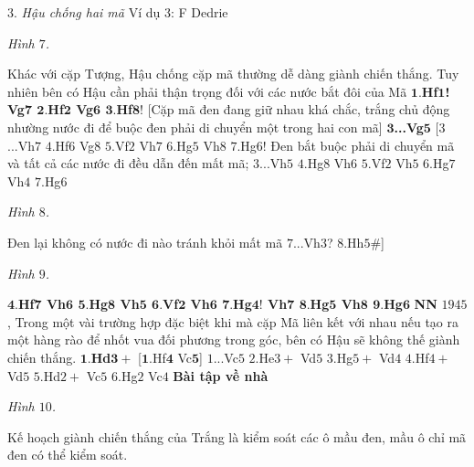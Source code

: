 \begin{multicols}{2}
	$3.$ \textit{Hậu chống hai mã}
	\vskip 0.1cm
	Ví dụ $3$: F Dedrie
	\begin{center}
		\newgame
		\showboard
		\vskip 0.1cm
		\textit{\small\color{gocco}Hình $7$.}
	\end{center}
	Khác với cặp Tượng, Hậu chống cặp mã thường dễ dàng  giành chiến thắng. Tuy nhiên bên có Hậu cần phải thận trọng đối với các nước bắt đôi của Mã
	$\pmb{1.}$\textbf{\color{gocco}Hf$\pmb{1}$! Vg$\pmb{7}$ $\pmb{2.}$Hf$\pmb{2}$ Vg$\pmb{6}$ $\pmb{3.}$Hf$\pmb{8!}$} [Cặp mã đen đang giữ nhau khá chắc, trắng chủ động nhường nước đi để buộc đen phải di chuyển một trong hai con mã]
	\vskip 0.1cm
	$\pmb{3}$\textbf{\color{gocco}...Vg}$\pmb{5}$ [$3$...Vh$7$ $4.$Hf$6$ Vg$8$ $5.$Vf$2$ Vh$7$ $6.$Hg$5$ Vh$8$ $7.$Hg$6!$ 
	\vskip 0.1cm
	Đen bắt buộc phải di chuyển mã và tất cả các nước đi đều dẫn đến mất mã; $3$...Vh$5$ $4.$Hg$8$ Vh$6$ $5.$Vf$2$ Vh$5$ $6.$Hg$7$ Vh$4$ $7.$Hg$6$
		\begin{center}
		\newgame
		\showboard
		\vskip 0.1cm
		\textit{\small\color{gocco}Hình $8$.}
	\end{center}
	Đen lại không có nước đi nào tránh khỏi mất mã $7$...Vh$3$? $8.$Hh$5\#$]
	\begin{center}
		\newgame
		\showboard
		\vskip 0.1cm
		\textit{\small\color{gocco}Hình $9$.}
	\end{center}
	$\pmb{4.}$\textbf{\color{gocco}Hf$\pmb{7}$ Vh$\pmb{6}$ $\pmb{5.}$Hg$\pmb{8}$ Vh$\pmb{5}$ $\pmb{6.}$Vf$\pmb{2}$ Vh$\pmb{6}$ $\pmb{7.}$Hg$\pmb{4!}$ Vh$\pmb{7}$ $\pmb{8.}$Hg$\pmb{5}$ Vh$\pmb{8}$ $\pmb{9.}$Hg$\pmb{6}$}
	\vskip 0.1cm
	\textbf{\color{gocco}NN} $1945$,
	\vskip 0.1cm 
	Trong một vài trường hợp đặc biệt khi mà cặp Mã liên kết với nhau nếu tạo ra một hàng rào để nhốt vua đối phương trong góc, bên có Hậu sẽ không thế giành chiến thắng.
	\vskip 0.1cm
	$\pmb{1.}$\textbf{\color{gocco}Hd}$\pmb{3+}$ [$\pmb{1.}$Hf$\pmb{4}$ Vc$\pmb{5}$]
	\vskip 0.1cm
	$1$...Vc$5$ $2.$He$3+$ Vd$5$ $3.$Hg$5+$ Vd$4$ $4.$Hf$4+$ Vd$5$ $5.$Hd$2+$ Vc$5$ $6.$Hg$2$ Vc$4$
	\vskip 0.1cm
	\textbf{\color{gocco}Bài tập về nhà}
	\begin{center}
		\newgame
		\showboard
		\vskip 0.1cm
		\textit{\small\color{gocco}Hình $10$.}
	\end{center}
	Kế hoạch giành chiến thắng của Trắng là kiểm soát các ô mầu đen, mầu ô chỉ mã đen có thể kiểm soát.

\end{multicols}
